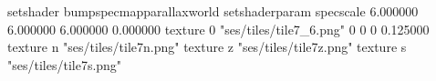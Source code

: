 setshader bumpspecmapparallaxworld
setshaderparam specscale 6.000000 6.000000 6.000000 0.000000
texture 0 "ses/tiles/tile7_6.png" 0 0 0 0.125000
texture n "ses/tiles/tile7n.png"
texture z "ses/tiles/tile7z.png"
texture s "ses/tiles/tile7s.png"

